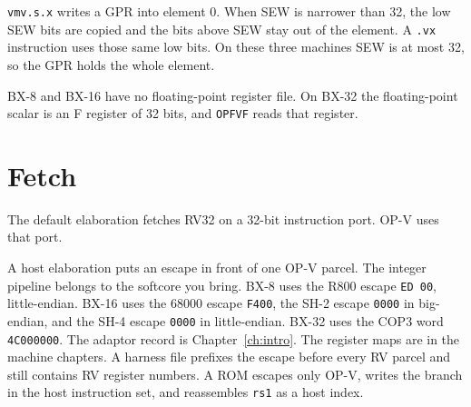 \texttt{vmv.s.x} writes a GPR into element 0. When SEW is narrower than 32, the low SEW bits are copied and the bits above SEW stay out of the element. A \texttt{.vx} instruction uses those same low bits. On these three machines SEW is at most 32, so the GPR holds the whole element.

BX-8 and BX-16 have no floating-point register file. On BX-32 the floating-point scalar is an F register of 32 bits, and \texttt{OPFVF} reads that register.

\section{Fetch}

The default elaboration fetches RV32 on a 32-bit instruction port. OP-V uses that port.

A host elaboration puts an escape in front of one OP-V parcel. The integer pipeline belongs to the softcore you bring. BX-8 uses the R800 escape \texttt{ED 00}, little-endian. BX-16 uses the 68000 escape \texttt{F400}, the SH-2 escape \texttt{0000} in big-endian, and the SH-4 escape \texttt{0000} in little-endian. BX-32 uses the COP3 word \texttt{4C000000}. The adaptor record is Chapter~\ref{ch:intro}. The register maps are in the machine chapters. A harness file prefixes the escape before every RV parcel and still contains RV register numbers. A ROM escapes only OP-V, writes the branch in the host instruction set, and reassembles \texttt{rs1} as a host index.
